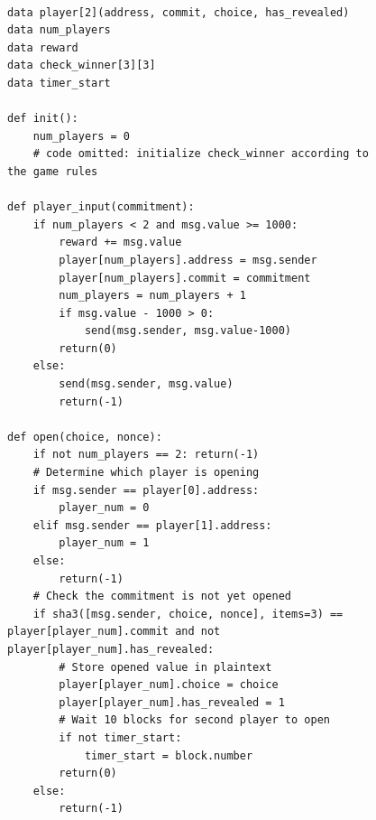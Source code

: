 \documentclass{llncs}
\begin{document}
\begin{figure}
\centering
\begin{minipage}{\columnwidth}%
\begin{mdframed}
\begin{verbatim}

data player[2](address, commit, choice, has_revealed)
data num_players
data reward
data check_winner[3][3]
data timer_start

def init():
	num_players = 0
	# code omitted: initialize check_winner according to the game rules

def player_input(commitment):
	if num_players < 2 and msg.value >= 1000:
		reward += msg.value
		player[num_players].address = msg.sender
		player[num_players].commit = commitment
		num_players = num_players + 1
		if msg.value - 1000 > 0:
			send(msg.sender, msg.value-1000)
		return(0)
	else:	
		send(msg.sender, msg.value)
		return(-1)
		
def open(choice, nonce):
	if not num_players == 2: return(-1)
	# Determine which player is opening
	if msg.sender == player[0].address:
		player_num = 0
	elif msg.sender == player[1].address:
		player_num = 1
	else:
		return(-1)
	# Check the commitment is not yet opened
	if sha3([msg.sender, choice, nonce], items=3) == player[player_num].commit and not player[player_num].has_revealed:
		# Store opened value in plaintext
		player[player_num].choice = choice
		player[player_num].has_revealed = 1		
		# Wait 10 blocks for second player to open
		if not timer_start:
			timer_start = block.number
		return(0)
	else:
		return(-1)
\end{verbatim}
\end{mdframed}
\end{minipage}
\end{figure}
%
%
\end{document}
